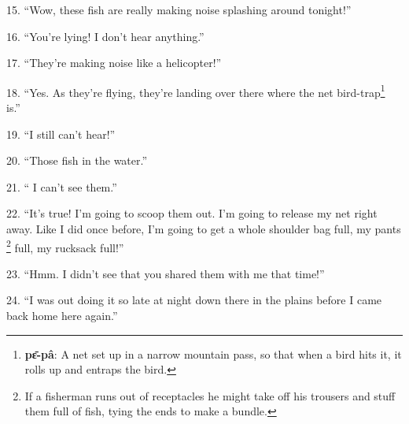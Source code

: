 15. ``Wow, these fish are really making noise splashing around tonight!''

16. ``You're lying! I don't hear anything.''

17. ``They're making noise like a helicopter!''

18. ``Yes. As they're flying, they're landing over there where the net bird-trap\footnote{\textbf{pɛ̄-pâ}: A net set up in a narrow mountain pass, so that when a bird hits it, it rolls up and entraps the bird.}
is.''

19. ``I still can't hear!''

20. ``Those fish in the water.''

21. `` I can't see them.''

22. ``It's true! I'm going to scoop them out. I'm going to release my net right
away. Like I did once before, I'm going to get a whole shoulder bag full, my pants
\footnote{If a fisherman runs out of receptacles he might take off his trousers and stuff them full of fish, tying the ends to make a bundle.} full, my rucksack full!''

23. ``Hmm. I didn't see that you shared them with me that time!''

24. ``I was out doing it so late at night down there in the plains before I came
back home here again.''

